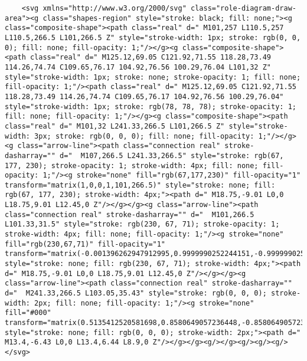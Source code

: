 \documentclass[
]{article}
\begin{document}
\begin{verbatim}
    <svg xmlns="http://www.w3.org/2000/svg" class="role-diagram-draw-area"><g class="shapes-region" style="stroke: black; fill: none;"><g class="composite-shape"><path class="real" d=" M101,257 L110.5,257 L110.5,266.5 L101,266.5 Z" style="stroke-width: 1px; stroke: rgb(0, 0, 0); fill: none; fill-opacity: 1;"/></g><g class="composite-shape"><path class="real" d=" M125.12,69.05 C121.92,71.55 118.28,73.49 114.26,74.74 C109.65,76.17 104.92,76.56 100.29,76.04 L101,32 Z" style="stroke-width: 1px; stroke: none; stroke-opacity: 1; fill: none; fill-opacity: 1;"/><path class="real" d=" M125.12,69.05 C121.92,71.55 118.28,73.49 114.26,74.74 C109.65,76.17 104.92,76.56 100.29,76.04" style="stroke-width: 1px; stroke: rgb(78, 78, 78); stroke-opacity: 1; fill: none; fill-opacity: 1;"/></g><g class="composite-shape"><path class="real" d=" M101,32 L241.33,266.5 L101,266.5 Z" style="stroke-width: 3px; stroke: rgb(0, 0, 0); fill: none; fill-opacity: 1;"/></g><g class="arrow-line"><path class="connection real" stroke-dasharray="" d="  M107,266.5 L241.33,266.5" style="stroke: rgb(67, 177, 230); stroke-opacity: 1; stroke-width: 4px; fill: none; fill-opacity: 1;"/><g stroke="none" fill="rgb(67,177,230)" fill-opacity="1" transform="matrix(1,0,0,1,101,266.5)" style="stroke: none; fill: rgb(67, 177, 230); stroke-width: 4px;"><path d=" M18.75,-9.01 L0,0 L18.75,9.01 L12.45,0 Z"/></g></g><g class="arrow-line"><path class="connection real" stroke-dasharray="" d="  M101,266.5 L101.33,31.5" style="stroke: rgb(230, 67, 71); stroke-opacity: 1; stroke-width: 4px; fill: none; fill-opacity: 1;"/><g stroke="none" fill="rgb(230,67,71)" fill-opacity="1" transform="matrix(-0.001396262947912995,0.9999990252244151,-0.9999990252244151,-0.001396262947912995,101.33331298828125,25.5)" style="stroke: none; fill: rgb(230, 67, 71); stroke-width: 4px;"><path d=" M18.75,-9.01 L0,0 L18.75,9.01 L12.45,0 Z"/></g></g><g class="arrow-line"><path class="connection real" stroke-dasharray="" d="  M241.33,266.5 L103.05,35.43" style="stroke: rgb(0, 0, 0); stroke-width: 2px; fill: none; fill-opacity: 1;"/><g stroke="none" fill="#000" transform="matrix(0.5135412520581698,0.8580649057236448,-0.8580649057236448,0.5135412520581698,101,32)" style="stroke: none; fill: rgb(0, 0, 0); stroke-width: 2px;"><path d=" M13.4,-6.43 L0,0 L13.4,6.44 L8.9,0 Z"/></g></g><g/></g><g/><g/><g/></svg>

\end{verbatim}
\end{document}
